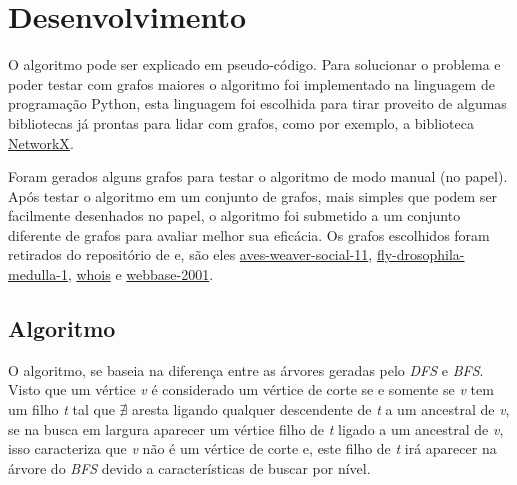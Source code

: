 \documentclass[
	article,
	12pt,
	openright,
	oneside,
	a4paper,
	english,
	french,
	spanish,
	brazil
	]{abntex2}
\begin{document}
\begin{figure*}[htb]
\begin{subfigure}{0.45\textwidth}
    \end{subfigure}
\end{figure*}

\section{Desenvolvimento}
O algoritmo pode ser explicado em pseudo-código. Para solucionar o problema e poder testar com grafos maiores o algoritmo foi implementado na linguagem de programação Python, esta linguagem foi escolhida para tirar proveito de algumas bibliotecas já prontas para lidar com grafos, como por exemplo, a biblioteca \href{https://networkx.github.io/}{NetworkX}.

Foram gerados alguns grafos para testar o algoritmo de modo manual (no papel). Após testar o algoritmo em um conjunto de grafos, mais simples que podem ser facilmente desenhados no papel, o algoritmo foi submetido a um conjunto diferente de grafos para avaliar melhor sua eficácia. Os grafos escolhidos foram retirados do repositório de  e, são eles \href{http://networkrepository.com/aves-weaver-social-11.php}{aves-weaver-social-11}, \href{http://networkrepository.com/bn-fly-drosophila-medulla-1.php}{fly-drosophila-medulla-1}, \href{http://networkrepository.com/tech-WHOIS.php}{whois} e \href{http://networkrepository.com/web-webbase-2001.php}{webbase-2001}.

\subsection{Algoritmo}
O algoritmo, se baseia na diferença entre as árvores geradas pelo \textit{DFS} e \textit{BFS}. Visto que um vértice \textit{v} é considerado um vértice de corte se e somente se \textit{v} tem um filho \textit{t} tal que \(\nexists\) aresta ligando qualquer descendente de \textit{t} a um ancestral de \textit{v}, se na busca em largura aparecer um vértice filho de \textit{t} ligado a um ancestral de \textit{v}, isso caracteriza que \textit{v} não é um vértice de corte e, este filho de \textit{t} irá aparecer na árvore do \textit{BFS} devido a características de buscar por nível.
\end{document}
